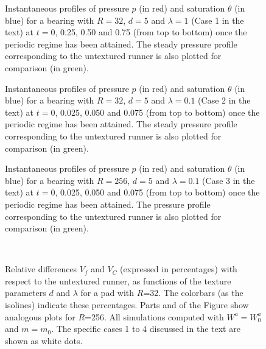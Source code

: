 \begin{figure}[h]
     \begin{center}
	\scalebox{0.7}{}
    \end{center}
\caption{Instantaneous profiles of pressure $p$ (in red) and saturation $\theta$ (in blue) for a bearing with $R=32$, $d=5$ and $\lambda=1$ (Case 1 in the text) 
at $t=0$, 0.25, 
0.50 and 0.75 (from top to bottom) once the periodic regime has been attained. 
The steady pressure profile corresponding to the untextured runner 
is also plotted for comparison (in green).}  
\label{figR32bubbles}
\end{figure}


\begin{figure}[h]
     \begin{center}
	\scalebox{0.7}{}
    \end{center}
\caption{Instantaneous profiles of pressure $p$ (in red) and saturation $\theta$ (in blue) for a bearing with $R=32$, $d=5$ and $\lambda=0.1$ (Case 2 in the text) 
at $t=0$, 0.025, 
0.050 and 0.075 (from top to bottom) once the periodic regime has been attained. 
The steady pressure profile corresponding to the untextured runner 
is also plotted for comparison (in green).
}  
\label{figR32bubblesper01}
\end{figure}

\begin{figure}[h]
     \begin{center}
	\scalebox{0.7}{}
    \end{center}
\caption{
Instantaneous profiles of pressure $p$ (in red) and saturation $\theta$ (in blue) for a bearing with $R=256$, $d=5$ and $\lambda=0.1$ (Case 3 in the text) 
at $t=0$, 0.025, 
0.050 and 0.075 (from top to bottom) once the periodic regime has been attained. 
The pressure profile corresponding to the untextured runner 
is also plotted for comparison (in green).
}  
\label{figR256bubbles}
\end{figure}

\begin{figure}[h]
     \begin{center}
	\subfigure[][]{\scalebox{0.65}{} \label{fig:R32f}}
	\subfigure[][]{\scalebox{0.65}{} \label{fig:R32C}} \\
	\subfigure[][]{\scalebox{0.65}{} \label{fig:R256f}}
	\subfigure[][]{\scalebox{0.65}{} \label{fig:R256C}}	
    \end{center}
\caption{Relative differences  $V_{f}$ and   $V_C$ (expressed in percentages) with respect to the untextured runner, as functions of the
texture parameters $d$ and $\lambda$ for a pad with $R$=32. The colorbars (as the isolines) indicate these percentages. Parts  and  of the
Figure show analogous plots for $R$=256. All simulations computed with $W^a=W^a_0$ and $m=m_0$. The specific cases 1 to 4 discussed in the text are shown as white dots.
}  
\label{fig:maps}
\end{figure}

